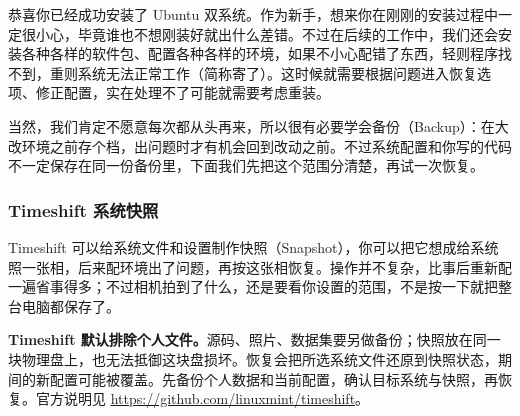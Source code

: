 恭喜你已经成功安装了 Ubuntu 双系统。作为新手，想来你在刚刚的安装过程中一定很小心，毕竟谁也不想刚装好就出什么差错。不过在后续的工作中，我们还会安装各种各样的软件包、配置各种各样的环境，如果不小心配错了东西，轻则程序找不到，重则系统无法正常工作（简称寄了）。这时候就需要根据问题进入恢复选项、修正配置，实在处理不了可能就需要考虑重装。

当然，我们肯定不愿意每次都从头再来，所以很有必要学会备份（Backup）：在大改环境之前存个档，出问题时才有机会回到改动之前。不过系统配置和你写的代码不一定保存在同一份备份里，下面我们先把这个范围分清楚，再试一次恢复。
\label{sec:system-backup}

\subsubsection{Timeshift 系统快照}
Timeshift 可以给系统文件和设置制作快照（Snapshot），你可以把它想成给系统照一张相，后来配环境出了问题，再按这张相恢复。操作并不复杂，比事后重新配一遍省事得多；不过相机拍到了什么，还是要看你设置的范围，不是按一下就把整台电脑都保存了。
\begin{note}
\textbf{Timeshift 默认排除个人文件。}源码、照片、数据集要另做备份；快照放在同一块物理盘上，也无法抵御这块盘损坏。恢复会把所选系统文件还原到快照状态，期间的新配置可能被覆盖。先备份个人数据和当前配置，确认目标系统与快照，再恢复。官方说明见 \url{https://github.com/linuxmint/timeshift}。
\end{note}
